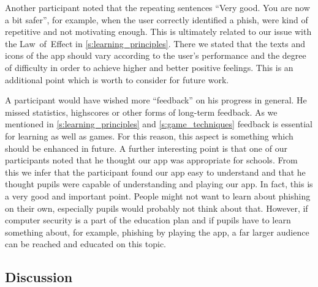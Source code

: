 \begin{description}[leftmargin=0cm]
Another participant noted that the repeating sentences ``Very good. You are now a bit safer'', for example, when the user correctly identified a phish, were kind of repetitive and not motivating enough. This is ultimately related to our issue with the Law~of~Effect in \autoref{s:learning_principles}.
There we stated that the texts and icons of the app should vary according to the user's performance and the degree of difficulty in order to achieve higher and better positive feelings.
This is an additional point which is worth to consider for future work.

A participant would have wished more ``feedback'' on his progress in general. 
He missed statistics, highscores or other forms of long-term feedback.
As we mentioned in \autoref{s:learning_principles} and \autoref{s:game_techniques} feedback is essential for learning as well as games.
For this reason, this aspect is something which should be enhanced in future.
A further interesting point is that one of our participants noted that he thought our app was appropriate for schools.
From this we infer that the participant found our app easy to understand and that he thought pupils were capable of understanding and playing our app.
In fact, this is a very good and important point.
People might not want to learn about phishing on their own, especially pupils would probably not think about that.
However, if computer security is a part of the education plan and if pupils have to learn something about, for example, phishing by playing the app, a far larger audience can be reached and educated on this topic.	
\end{description}

\subsection{Discussion}

%